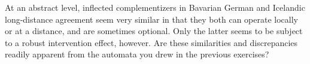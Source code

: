 \begin{exercise}
    At an abstract level, inflected complementizers in Bavarian German and Icelandic long-distance agreement seem very similar in that they both can operate locally or at a distance, and are sometimes optional.
    Only the latter seems to be subject to a robust intervention effect, however.
    Are these similarities and discrepancies readily apparent from the automata you drew in the previous exercises?
\end{exercise}
